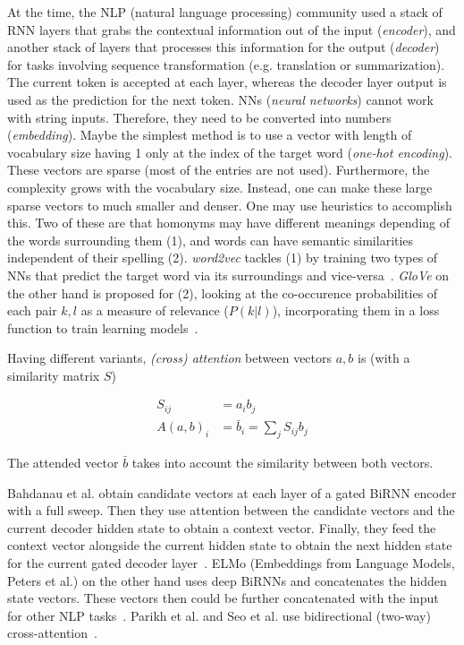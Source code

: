 \documentclass{book}
\numberwithin{equation}{subsection}
\begin{document}
At the time, the NLP (natural language processing) community used a stack of RNN layers that grabs the contextual information out of the input (\textit{encoder}), and another stack of layers that processes this information for the output (\textit{decoder}) for tasks involving sequence transformation (e.g. translation or summarization). The current token is accepted at each layer, whereas the decoder layer output is used as the prediction for the next token. NNs (\textit{neural networks}) cannot work with string inputs. Therefore, they need to be converted into numbers (\textit{embedding}). Maybe the simplest method is to use a vector with length of vocabulary size having 1 only at the index of the target word (\textit{one-hot encoding}). These vectors are sparse (most of the entries are not used). Furthermore, the complexity grows with the vocabulary size. Instead, one can make these large sparse vectors to much smaller and denser. One may use heuristics to accomplish this. Two of these are that homonyms may have different meanings depending of the words surrounding them (1), and words can have semantic similarities independent of their spelling (2). \textit{word2vec} tackles (1) by training two types of NNs that predict the target word via its surroundings and vice-versa~\cite{mikolov_efficient_2013}. \textit{GloVe} on the other hand is proposed for (2), looking at the co-occurence probabilities of each pair $k, l$ as a measure of relevance ($P(k|l)$), incorporating them in a loss function to train learning models~\cite{pennington_glove_2014}.

Having different variants, \textit{(cross) attention} between vectors $a, b$ is (with a similarity matrix $S$)

\begin{align}
    S_{ij} &= a_i b_j\\
    A(a,b)_{i} &= \bar{b}_{i} = \sum_j S_{ij} b_j
\end{align}

The attended vector $\bar{b}$ takes into account the similarity between both vectors.

Bahdanau et al. obtain candidate vectors at each layer of a gated BiRNN encoder with a full sweep. Then they use attention between the candidate vectors and the current decoder hidden state to obtain a context vector. Finally, they feed the context vector alongside the current hidden state to obtain the next hidden state for the current gated decoder layer~\cite{bahdanau_neural_2016}. ELMo (Embeddings from Language Models, Peters et al.) on the other hand uses deep BiRNNs and concatenates the hidden state vectors. These vectors then could be further concatenated with the input for other NLP tasks~\cite{peters_deep_2018}. Parikh et al. and Seo et al. use bidirectional (two-way) cross-attention~\cite{parikh_decomposable_2016, seo_bidirectional_2018}.
\end{document}
